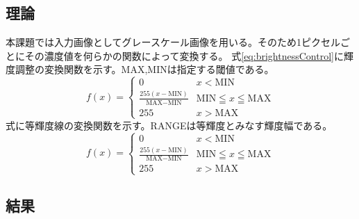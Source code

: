 \documentclass[11pt,a4paper,titlepage,dvipdfmx]{jarticle}
\begin{document}
    \subsection{理論}
      本課題では入力画像としてグレースケール画像を用いる。そのため1ピクセルごとにその濃度値を何らかの関数によって変換する。
      式\eqref{eq:brightnessControl}に輝度調整の変換関数を示す。MAX,MINは指定する閾値である。
      \begin{equation} \label{eq:brightnessControl}
        f(x) = 
        \begin{cases}
        0   &   x < \text{MIN}  \\
        \frac{255(x - \text{MIN})}{\text{MAX} - \text{MIN}} & \text{MIN} \leqq x \leqq \text{MAX} \\
        255        &  x > \text{MAX} 
        \end{cases}
      \end{equation}
      式に等輝度線の変換関数を示す。RANGEは等輝度とみなす輝度幅である。
      \begin{equation} \label{eq:isohighlightLine}
        f(x) = 
        \begin{cases}
        0   &   x < \text{MIN}  \\
        \frac{255(x - \text{MIN})}{\text{MAX} - \text{MIN}} & \text{MIN} \leqq x \leqq \text{MAX} \\
        255        &  x > \text{MAX} 
        \end{cases}
      \end{equation}
    \subsection{結果}
\end{document}
